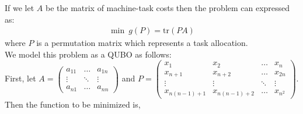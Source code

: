 \documentclass{article}
\begin{document}
\noindent If we let \(A\) be the matrix of machine-task costs then the problem can expressed as: 
\begin{align*}
    \min \: g(P) = \text{tr}(PA)
\end{align*}
where \(P\) is a permutation matrix which represents a task allocation. \\

\noindent We model this problem as a QUBO as follows: \\ 

\noindent First, let \(A = \begin{pmatrix}
    a_{11} & \hdots & a_{1n} \\
    \vdots & \ddots & \vdots \\
    a_{n1} & \hdots & a_{nn}
\end{pmatrix}\) and \(P = \begin{pmatrix}
    x_{1} & x_2 & \hdots & x_{n} \\
    x_{n + 1} & x_{n + 2} & \hdots & x_{2n} \\
    \vdots & \vdots & \ddots & \vdots \\
    x_{n(n-1)+1} & x_{n(n-1)+2} & \hdots & x_{n^2}
\end{pmatrix}\).
Then the function to be minimized is,
\end{document}
